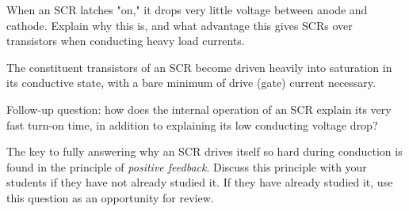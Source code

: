 

When an SCR latches "on," it drops very little voltage between anode and cathode.  Explain why this is, and what advantage this gives SCRs over transistors when conducting heavy load currents.







The constituent transistors of an SCR become driven heavily into saturation in its conductive state, with a bare minimum of drive (gate) current necessary.

\vskip 10pt

Follow-up question: how does the internal operation of an SCR explain its very fast turn-on time, in addition to explaining its low conducting voltage drop?







The key to fully answering why an SCR drives itself so hard during conduction is found in the principle of {\it positive feedback}.  Discuss this principle with your students if they have not already studied it.  If they have already studied it, use this question as an opportunity for review.




